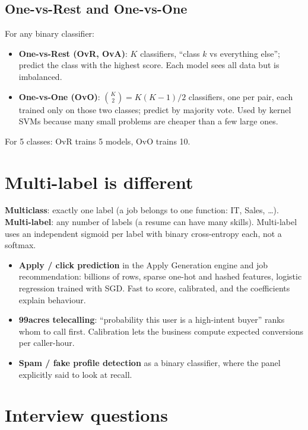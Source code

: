 \subsection{One-vs-Rest and One-vs-One}
For any binary classifier:
\begin{itemize}
\item \textbf{One-vs-Rest (OvR, OvA)}: $K$ classifiers, ``class $k$ vs everything else''; predict the class with the
  highest score. Each model sees all data but is imbalanced.
\item \textbf{One-vs-One (OvO)}: $\binom{K}{2} = K(K-1)/2$ classifiers, one per pair, each trained only on those two
  classes; predict by majority vote. Used by kernel SVMs because many small problems are cheaper than a few large ones.
\end{itemize}
For 5 classes: OvR trains 5 models, OvO trains 10.

\section{Multi-label is different}
\textbf{Multiclass}: exactly one label (a job belongs to one function: IT, Sales, \dots). \textbf{Multi-label}:
any number of labels (a resume can have many skills). Multi-label uses an independent sigmoid per label with binary
cross-entropy each, not a softmax.

\begin{practical}
\begin{itemize}
\item \textbf{Apply / click prediction} in the Apply Generation engine and job recommendation: billions of rows,
  sparse one-hot and hashed features, logistic regression trained with SGD. Fast to score, calibrated, and the
  coefficients explain behaviour.
\item \textbf{99acres telecalling}: ``probability this user is a high-intent buyer'' ranks whom to call first.
  Calibration lets the business compute expected conversions per caller-hour.
\item \textbf{Spam / fake profile detection} as a binary classifier, where the panel explicitly said to look at recall.
\end{itemize}
\end{practical}

\section{Interview questions}

